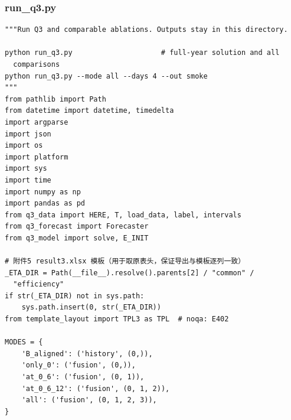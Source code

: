 \subsubsection*{run\_q3.py}
\begin{verbatim}
"""Run Q3 and comparable ablations. Outputs stay in this directory.

python run_q3.py                     # full-year solution and all
  comparisons
python run_q3.py --mode all --days 4 --out smoke
"""
from pathlib import Path
from datetime import datetime, timedelta
import argparse
import json
import os
import platform
import sys
import time
import numpy as np
import pandas as pd
from q3_data import HERE, T, load_data, label, intervals
from q3_forecast import Forecaster
from q3_model import solve, E_INIT

# 附件5 result3.xlsx 模板（用于取原表头，保证导出与模板逐列一致）
_ETA_DIR = Path(__file__).resolve().parents[2] / "common" /
  "efficiency"
if str(_ETA_DIR) not in sys.path:
    sys.path.insert(0, str(_ETA_DIR))
from template_layout import TPL3 as TPL  # noqa: E402

MODES = {
    'B_aligned': ('history', (0,)),
    'only_0': ('fusion', (0,)),
    'at_0_6': ('fusion', (0, 1)),
    'at_0_6_12': ('fusion', (0, 1, 2)),
    'all': ('fusion', (0, 1, 2, 3)),
}



\end{verbatim}
